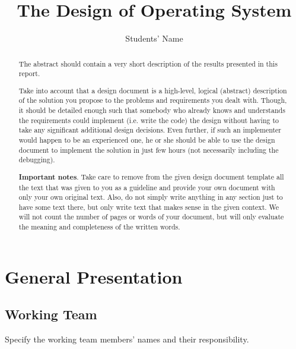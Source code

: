\documentclass[a4paper,12pt]{report}
\title{The Design of \OSName{} Operating System}
\author{Students' Name}
\begin{document}


\maketitle

\begin{abstract}
The abstract should contain a very short description of the results presented in this report. 

Take into account that a design document is a high-level, logical (abstract) description of the solution you propose to the problems and requirements you dealt with. Though, it should be detailed enough such that somebody who already knows and understands the requirements could implement (i.e. write the code) the design without having to take any significant additional design decisions. Even further, if such an implementer would happen to be an experienced one, he or she should be able to use the design document to implement the solution in just few hours (not necessarily including the debugging). 

\textbf{Important notes}. Take care to remove from the given design document template all the text that was given to you as a guideline and provide your own document with only your own original text. Also, do not simply write anything in any section just to have some text there, but only write text that makes sense in the given context. We will not count the number of pages or words of your document, but will only evaluate the meaning and completeness of the written words. 
\end{abstract}


\chapter{General Presentation}

\section{Working Team}

Specify the working team members' names and their responsibility.
\end{document}
